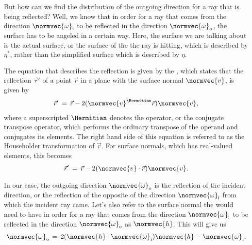 But how can we find the distribution of the outgoing direction for a ray that is being reflected? Well, we know that in order for a ray that comes from the direction $\normvec{\omega}_{\text{i}}$ to be reflected in the direction $\normvec{\omega}_{\text{o}}$, the surface has to be angeled in a certain way. Here, the surface we are talking about is the actual surface, or the surface of the \microfacet the ray is hitting, which is described by $\eta^*$, rather than the simplified surface which is described by $\eta$.

The equation that describes the reflection is given by the , which states that the reflection $\vec{r}'$ of a point $\vec{r}$ in a plane with the surface normal $\normvec{v}$, is given by
%
\begin{equation}
\vec{r}' \,=\, \vec{r} - 2(\normvec{v}^{\Hermitian}\vec{r})\normvec{v},
\end{equation}
%
where a superscripted $\Hermitian$ denotes the  operator, or the conjugate transpose operator, which performs the ordinary transpose of the operand and conjugates its elements. The right hand side of this equation is referred to as the Householder transformation of $\vec{r}$. For surface normals, which has real-valued elements, this becomes
%
\begin{equation}
\vec{r}' \,=\, \vec{r} - 2(\normvec{v}\cdot\vec{r})\normvec{v}.
\end{equation}

In our case, the outgoing direction $\normvec{\omega}_{\text{o}}$ is the reflection of the incident direction, or the reflection of the opposite of the direction $\normvec{\omega}_{\text{i}}$ from which the incident ray came. Let's also refer to the surface normal the \microfacet would need to have in order for a ray that comes from the direction $\normvec{\omega}_{\text{i}}$ to be reflected in the direction $\normvec{\omega}_{\text{o}}$ as $\normvec{h}$. This will give us
%
\begin{equation} \label{eq:householder_equation}
\normvec{\omega}_{\text{o}} \,=\, 2(\normvec{h}\cdot\normvec{\omega}_{\text{i}})\normvec{h} - \normvec{\omega}_{\text{i}}.
\end{equation}

